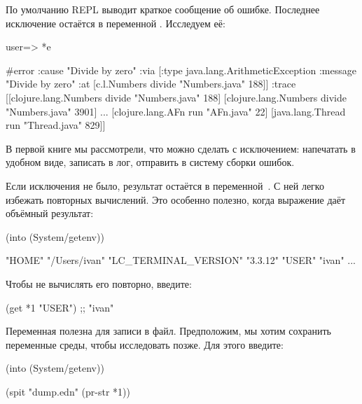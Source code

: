 
По умолчанию REPL выводит краткое сообщение об ошибке. Последнее исключение остаётся в переменной . Исследуем её:

\begin{english}
  \begin{clojure}
user=> *e

#error {
 :cause "Divide by zero"
 :via
 [{:type java.lang.ArithmeticException
   :message "Divide by zero"
   :at [c.l.Numbers divide "Numbers.java" 188]}]
 :trace
 [[clojure.lang.Numbers divide "Numbers.java" 188]
  [clojure.lang.Numbers divide "Numbers.java" 3901]
  ...
  [clojure.lang.AFn run "AFn.java" 22]
  [java.lang.Thread run "Thread.java" 829]]}
  \end{clojure}
\end{english}

В первой книге мы рассмотрели, что можно сделать с исключением: напечатать в удобном виде, записать в лог, отправить в систему сборки ошибок.

Если исключения не было, результат остаётся в переменной~. С ней легко избежать повторных вычислений. Это особенно полезно, когда выражение даёт объёмный результат:

\begin{english}
  \begin{clojure}
(into {} (System/getenv))

{"HOME" "/Users/ivan"
 "LC_TERMINAL_VERSION" "3.3.12"
 "USER" "ivan"
 ...}
  \end{clojure}
\end{english}

Чтобы не вычислять его повторно, введите:

\begin{english}
  \begin{clojure}
(get *1 "USER")
;; "ivan"
  \end{clojure}
\end{english}

Переменная  полезна для записи в файл. Предположим, мы хотим сохранить переменные среды, чтобы исследовать позже. Для этого введите:

\begin{english}
  \begin{clojure}
(into {} (System/getenv))

(spit "dump.edn" (pr-str *1))
  \end{clojure}
\end{english}

